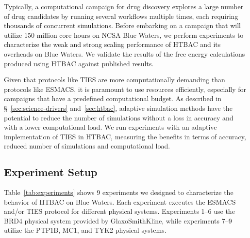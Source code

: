 Typically, a computational campaign for drug discovery explores a large
number of drug candidates by running several workflows multiple times, each
requiring thousands of concurrent simulations. Before embarking on a campaign
that will utilize 150 million core hours on NCSA Blue Waters, we perform
experiments to characterize the weak and strong scaling performance of HTBAC
and its overheads on Blue Waters. We validate the results of the free energy
calculations produced using HTBAC against published results.

Given that protocols like TIES are more computationally demanding than
protocols like ESMACS, it is paramount to use resources efficiently,
especially for campaigns that have a predefined computational budget. As
described in \S~\ref{sec:science-drivers} and~\ref{sec:htbac}, adaptive
simulation methods have the potential to reduce the number of simulations
without a loss in accuracy and with a lower computational load. We run
experiments with an adaptive implementation of TIES in HTBAC, measuring the
benefits in terms of accuracy, reduced number of simulations and
computational load.

\subsection{Experiment Setup}\label{ssec:exp_design}

Table~\ref{tab:experiments} shows 9 experiments we designed to characterize
the behavior of HTBAC on Blue Waters. Each experiment executes the ESMACS
and/or TIES protocol for different physical systems. Experiments 1--6 use the
BRD4 physical system provided by GlaxoSmithKline, while experiments 7--9
utilize the PTP1B, MC1, and TYK2 physical systems.

